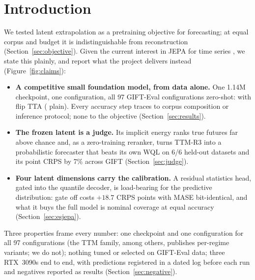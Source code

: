 \section{Introduction}
\label{sec:intro}

We tested latent extrapolation as a pretraining objective for
forecasting; at equal corpus and budget it is indistinguishable from
reconstruction (Section~\ref{sec:objective}). Given the current interest
in JEPA for time series \citep{lecun2022path,assran2023ijepa}, we state
this plainly, and report what the project delivers instead
(Figure~\ref{fig:claims}):

\begin{itemize}
\item \textbf{A competitive small foundation model, from data alone.}
One 1.14M checkpoint, one configuration, all 97 GIFT-Eval configurations
zero-shot:  with flip TTA (
plain). Every accuracy step traces to corpus composition or inference
protocol; none to the objective (Section~\ref{sec:results}).
\item \textbf{The frozen latent is a judge.} Its implicit energy ranks
true futures far above chance and, as a zero-training reranker, turns
TTM-R3 \citep{ekambaram2024ttm} into a probabilistic forecaster that
beats its own WQL on 6/6 held-out datasets and its point CRPS by 7\%
across GIFT (Section~\ref{sec:judge}).
\item \textbf{Four latent dimensions carry the calibration.} A residual
statistics head, gated into the quantile decoder, is load-bearing for
the predictive distribution: gate off costs $+18.7$ CRPS points with
MASE bit-identical, and what it buys the full model is nominal coverage
at equal accuracy (Section~\ref{sec:esjepa}).
\end{itemize}

Three properties frame every number: one checkpoint and one
configuration for all 97 configurations (the TTM family, among others,
publishes per-regime variants; we do not); nothing tuned or selected on
GIFT-Eval data; three RTX~3090s end to end, with predictions registered
in a dated log before each run and negatives reported as results
(Section~\ref{sec:negative}).

